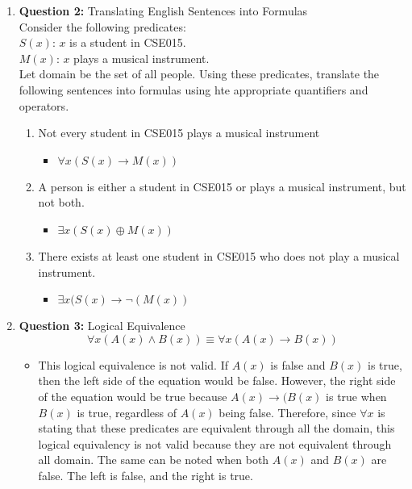 \documentclass[11pt]{article}
\begin{document}
\begin{enumerate}
\item 
\textbf{Question 2:} Translating English Sentences into Formulas \\
Consider the following predicates: \\
$S(x)$: $x$ is a student in CSE015. \\
$M(x)$: $x$ plays a musical instrument. \\
Let domain be the set of all people. Using these predicates, translate the following sentences into formulas using hte appropriate quantifiers and operators.
\begin{enumerate}[label=(\alph*)]
\item 
Not every student in CSE015 plays a musical instrument
\begin{itemize}
    \item 
    $\forall x(S(x) \rightarrow M(x))$
\end{itemize}
\item 
A person is either a student in CSE015 or plays a musical instrument, but not both.
\begin{itemize}
    \item 
    $\exists x(S(x) \oplus M(x))$
\end{itemize}
\item 
There exists at least one student in CSE015 who does not play a musical instrument.
\begin{itemize}
    \item 
    $\exists x(S(x) \rightarrow \lnot(M(x))$
\end{itemize}
\end{enumerate}
\item 
\textbf{Question 3:} Logical Equivalence 
\begin{equation}
    \forall x(A(x) \wedge B(x)) \equiv \forall x(A(x) \rightarrow B(x))
\end{equation}
\begin{itemize}
    \item 
    This logical equivalence is not valid. If $ A(x)$ is false and $B(x)$ is true, then the left side of the equation would be false. However, the right side of the equation would be true because $A(x) \rightarrow (B(x)$ is true when $B(x)$ is true, regardless of $A(x)$ being false. Therefore, since $\forall x$ is stating that these predicates are equivalent through all the domain, this logical equivalency is not valid because they are not equivalent through all domain. The same can be noted when both $A(x)$ and $B(x)$ are false. The left is false, and the right is true.

\end{itemize}
\end{enumerate}
\end{document}
